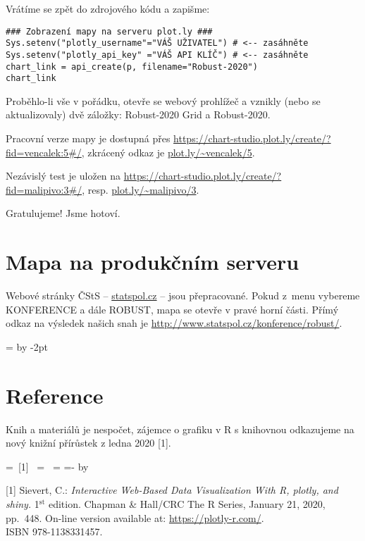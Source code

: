 Vrátíme se zpět do zdrojového kódu a zapišme:

\begin{lstlisting}
### Zobrazení mapy na serveru plot.ly ###
Sys.setenv("plotly_username"="VÁŠ UŽIVATEL") # <-- zasáhněte 
Sys.setenv("plotly_api_key" ="VÁŠ API KLÍČ") # <-- zasáhněte
chart_link = api_create(p, filename="Robust-2020")
chart_link
\end{lstlisting}

Proběhlo-li vše v pořádku, otevře se webový prohlížeč a vznikly (nebo se aktualizovaly) dvě záložky: Robust-2020 Grid a Robust-2020. 

Pracovní verze mapy je dostupná přes \url{https://chart-studio.plot.ly/create/?fid=vencalek:5#/}, zkrácený odkaz je \url{plot.ly/~vencalek/5}.

Nezávislý test je uložen na \url{https://chart-studio.plot.ly/create/?}\\\url{fid=malipivo:3#/}, resp. \url{plot.ly/~malipivo/3}.

Gratulujeme! Jsme hotoví. 


\section{Mapa na produkčním serveru}

Webové stránky ČStS -- \url{statspol.cz} -- jsou přepracované. Pokud z~menu vybereme KONFERENCE a dále ROBUST, mapa se otevře v pravé horní části. Přímý odkaz na výsledek našich snah je \url{http://www.statspol.cz/konference/robust/}.%
\medskip

\noindent
\newdimen\maltemp \maltemp=\textwidth
\advance\maltemp by -2pt
\fboxrule=1pt
\fboxsep=0pt


\section*{Reference}

Knih a materiálů je nespočet, zájemce o grafiku v R s knihovnou  odkazujeme na nový knižní přírůstek z ledna 2020 [1].\medskip

=\hbox{ [1] }
=\hbox{ }
\leftskip=
\parindent=-
\advance\parindent by 

[1] Sievert, C.: \textit{Interactive Web-Based Data Visualization With R, plotly, and shiny.} 1$^\text{st}$ edition. Chapman \& Hall/CRC The R Series, January 21, 2020, pp.~448. On-line version available at: \url{https://plotly-r.com/}.\\ 
ISBN 978-1138331457. 


